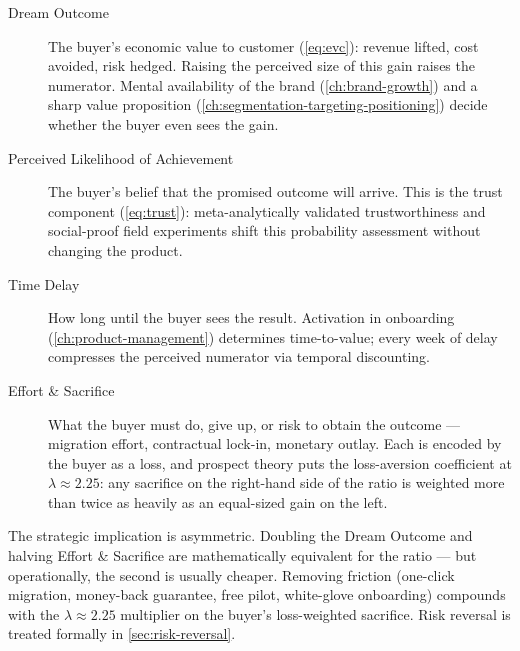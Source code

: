 \begin{description}
  \item[Dream Outcome] The buyer's economic value to customer (\cref{eq:evc}): revenue lifted, cost avoided, risk hedged. Raising the perceived size of this gain raises the numerator. Mental availability of the brand (\cref{ch:brand-growth}) and a sharp value proposition (\cref{ch:segmentation-targeting-positioning}) decide whether the buyer even sees the gain.
  \item[Perceived Likelihood of Achievement] The buyer's belief that the promised outcome will arrive. This is the trust component (\cref{eq:trust}): meta-analytically validated trustworthiness \parencite{colquitt2007meta} and social-proof field experiments \parencite{goldstein2008field} shift this probability assessment without changing the product.
  \item[Time Delay] How long until the buyer sees the result. Activation in onboarding (\cref{ch:product-management}) determines time-to-value; every week of delay compresses the perceived numerator via temporal discounting.
  \item[Effort \& Sacrifice] What the buyer must do, give up, or risk to obtain the outcome --- migration effort, contractual lock-in, monetary outlay. Each is encoded by the buyer as a loss, and prospect theory \parencite{tversky1992cumulative} puts the loss-aversion coefficient at $\lambda \approx 2.25$: any sacrifice on the right-hand side of the ratio is weighted more than twice as heavily as an equal-sized gain on the left.
\end{description}

The strategic implication is asymmetric. Doubling the Dream Outcome and halving Effort \& Sacrifice are mathematically equivalent for the ratio --- but operationally, the second is usually cheaper. Removing friction (one-click migration, money-back guarantee, free pilot, white-glove onboarding) compounds with the $\lambda \approx 2.25$ multiplier on the buyer's loss-weighted sacrifice. Risk reversal is treated formally in \cref{sec:risk-reversal}.

